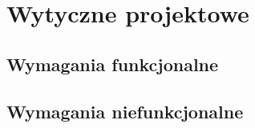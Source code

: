 \section{Wytyczne projektowe}

\subsection{Wymagania funkcjonalne}

\subsection{Wymagania niefunkcjonalne}

